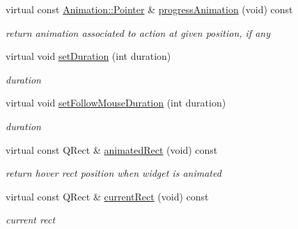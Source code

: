 \begin{DoxyCompactItemize}
virtual const \hyperlink{class_animation_ac48a8d074abd43dc3f6485353ba24e30}{Animation\+::\+Pointer} \& \hyperlink{class_menu_bar_data_v2_a1075516deb641b7b4f2d8da6a3a798a6}{progress\+Animation} (void) const
\begin{DoxyCompactList}\small\item\em return animation associated to action at given position, if any \end{DoxyCompactList}\item 
\mbox{\label{class_menu_bar_data_v2_af8d3fc464484b8e3e72bfbea0fc18186}} 
virtual void \hyperlink{class_menu_bar_data_v2_af8d3fc464484b8e3e72bfbea0fc18186}{set\+Duration} (int duration)
\begin{DoxyCompactList}\small\item\em duration \end{DoxyCompactList}\item 
\mbox{\label{class_menu_bar_data_v2_a682e49fafd79446a573b3977717f2d78}} 
virtual void \hyperlink{class_menu_bar_data_v2_a682e49fafd79446a573b3977717f2d78}{set\+Follow\+Mouse\+Duration} (int duration)
\begin{DoxyCompactList}\small\item\em duration \end{DoxyCompactList}\item 
\mbox{\label{class_menu_bar_data_v2_a341eb90d22cbdeab0812c521699073c5}} 
virtual const Q\+Rect \& \hyperlink{class_menu_bar_data_v2_a341eb90d22cbdeab0812c521699073c5}{animated\+Rect} (void) const
\begin{DoxyCompactList}\small\item\em return \textquotesingle{}hover\textquotesingle{} rect position when widget is animated \end{DoxyCompactList}\item 
\mbox{\label{class_menu_bar_data_v2_a3da0f1e64fa6b17d4b6d57a69c338e55}} 
virtual const Q\+Rect \& \hyperlink{class_menu_bar_data_v2_a3da0f1e64fa6b17d4b6d57a69c338e55}{current\+Rect} (void) const
\begin{DoxyCompactList}\small\item\em current rect \end{DoxyCompactList}\item 
\mbox{\label{class_menu_bar_data_v2_a9eab957f8db8f1422cc6d90bfc22874e}} 

\end{DoxyCompactItemize}
